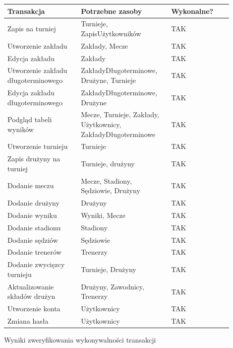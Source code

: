 \documentclass{mwrep}
\begin{document}
\vspace{1cm}
\begin{threeparttable}[H]
	\begin{tabular}{|p{0.3\linewidth}|p{0.35\linewidth}|p{0.25\linewidth}|}
	\hline
	Transakcja & Potrzebne zasoby & Wykonalne? \\ \hline
	Zapis na turniej & Turnieje, ZapisUżytkowników & TAK \\ \hline
	Utworzenie zakładu & Zakłady, Mecze & TAK \\ \hline
	Edycja zakładu & Zakłady & TAK \\ \hline
	Utworzenie zakładu długoterminowego & ZakładyDługoterminowe, Drużyne, Turnieje & TAK \\ \hline
	Edycja zakładu długoterminowego & ZakładyDługoterminowe, Drużyne & TAK \\ \hline
	Podgląd tabeli wyników  & Mecze, Turnieje, Zakłady, Użytkownicy, ZakładyDługoterminowe & TAK \\ \hline
	Utworzenie turnieju & Turnieje & TAK \\ \hline
	Zapis drużyny na turniej & Turnieje, drużyny & TAK \\ \hline
	Dodanie meczu & Mecze, Stadiony, Sędziowie, Drużyny & TAK \\ \hline
	Dodanie drużyny & Drużyny & TAK \\ \hline
	Dodanie wyniku & Wyniki, Mecze & TAK \\ \hline
	Dodanie stadionu & Stadiony & TAK \\ \hline
	Dodanie sędziów & Sędziowie & TAK \\ \hline
	Dodanie trenerów & Trenerzy & TAK \\ \hline
	Dodanie zwycięzcy turnieju & Turnieje, Drużyny & TAK \\ \hline
	Aktualizowanie składów drużyn & Drużyny, Zawodnicy, Trenerzy & TAK \\ \hline
	Utworzenie konta & Użytkownicy & TAK \\ \hline
	Zmiana hasła & Użytkownicy & TAK \\ \hline
	\end{tabular}	
	\caption{Wyniki zweryfikowania wykonywalności transakcji}
\end{threeparttable}
\vspace{1cm}
\end{document}
